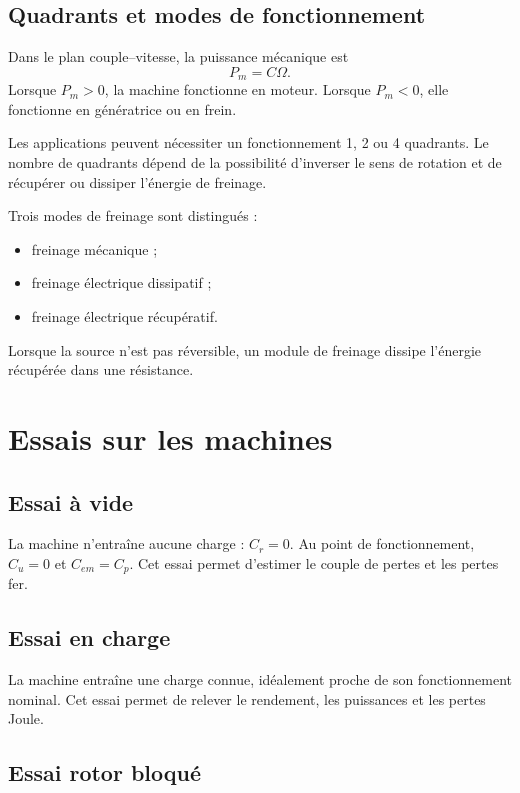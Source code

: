 \subsection{Quadrants et modes de fonctionnement}

Dans le plan couple--vitesse, la puissance mécanique est
\[
P_m=C\Omega.
\]
Lorsque $P_m>0$, la machine fonctionne en moteur. Lorsque $P_m<0$, elle fonctionne en génératrice ou en frein.

\TLQuadrantsMachine

Les applications peuvent nécessiter un fonctionnement 1, 2 ou 4 quadrants. Le nombre de quadrants dépend de la possibilité d'inverser le sens de rotation et de récupérer ou dissiper l'énergie de freinage.

Trois modes de freinage sont distingués :
\begin{itemize}
  \item freinage mécanique ;
  \item freinage électrique dissipatif ;
  \item freinage électrique récupératif.
\end{itemize}
Lorsque la source n'est pas réversible, un module de freinage dissipe l'énergie récupérée dans une résistance.

\TLFreinageDissipatif

\section{Essais sur les machines}\label{sec:em-essais}

\TLEssaisMachines

\subsection{Essai à vide}

La machine n'entraîne aucune charge : $C_r=0$. Au point de fonctionnement, $C_u=0$ et $C_{em}=C_p$. Cet essai permet d'estimer le couple de pertes et les pertes fer.

\subsection{Essai en charge}

La machine entraîne une charge connue, idéalement proche de son fonctionnement nominal. Cet essai permet de relever le rendement, les puissances et les pertes Joule.

\subsection{Essai rotor bloqué}

